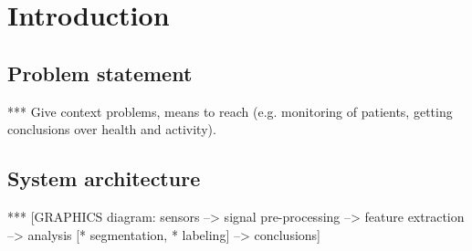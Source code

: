 
\chapter{Introduction} %

\label{Chapter1} %



\section{Problem statement}
*** Give context problems, means to reach (e.g. monitoring of patients,  getting conclusions over health and activity).




\section{System architecture}

*** [GRAPHICS diagram: sensors --> signal pre-processing --> feature extraction --> analysis [* segmentation, * labeling] --> conclusions]


